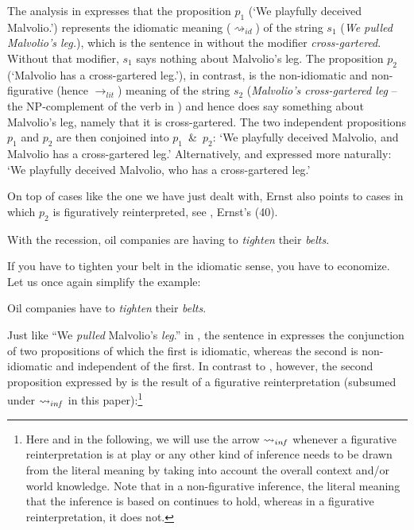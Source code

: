 \documentclass[output=paper]{langsci/langscibook}
\begin{document}
\noindent The analysis in  expresses that the proposition $p_{1}$ (`We playfully deceived Malvolio.') represents the idiomatic meaning ($\rightsquigarrow_{id}$) of the string $s_{1}$ (\textit{We pulled Malvolio's leg.}), which is the sentence in  without the modifier \textit{cross-gartered}. Without that modifier, $s_{1}$ says nothing about Malvolio's leg. The proposition $p_{2}$ (`Malvolio has a cross-gartered leg.'), in contrast, is the non-idiomatic and non-figurative (hence $\rightarrow_{lit}$) meaning of the string $s_{2}$ (\textit{Malvolio's cross-gartered leg} -- the NP-complement of the verb in ) and hence does say something about Malvolio's leg, namely that it is cross-gartered. The two independent propositions $p_{1}$ and $p_{2}$ are then conjoined into \mbox{$p_{1}$ \& $p_{2}$}: `We playfully deceived Malvolio, and Malvolio has a cross-gartered leg.' Alternatively, and expressed more naturally: `We playfully deceived Malvolio, who has a cross-gartered leg.' 

On top of cases like the one we have just dealt with, Ernst also points to cases in which $p_{2}$ is figuratively reinterpreted, see , Ernst's (40).

\ea \label{Gucci belts}
With the recession, oil companies are having to \textit{tighten} their \underline{} \textit{belts}.
\z

\noindent If you have to tighten your belt in the idiomatic sense, you have to economize. Let us once again simplify the example:

\ea \label{Gucci belts -- simple}
Oil companies have to \textit{tighten} their \underline{} \textit{belts}.
\z

\noindent Just like ``We \textit{pulled} Malvolio's \underline{} \textit{leg}.'' in , the sentence in  expresses the conjunction of two propositions of which the first is idiomatic, whereas the second is non-idiomatic and independent of the first. In contrast to , however, the second proposition expressed by  is the result of a figurative reinterpretation (subsumed under $\rightsquigarrow_{in\hspace{-0.8pt} f}$ in this paper):\footnote{Here and in the following, we will use the arrow $\rightsquigarrow_{in\hspace{-0.8pt} f}$ whenever a figurative reinterpretation is at play or any other kind of inference needs to be drawn from the literal meaning by taking into account the overall context and/or world knowledge. Note that in a non-figurative inference, the literal meaning that the inference is based on continues to hold, whereas in a figurative reinterpretation, it does not.}
\end{document}
